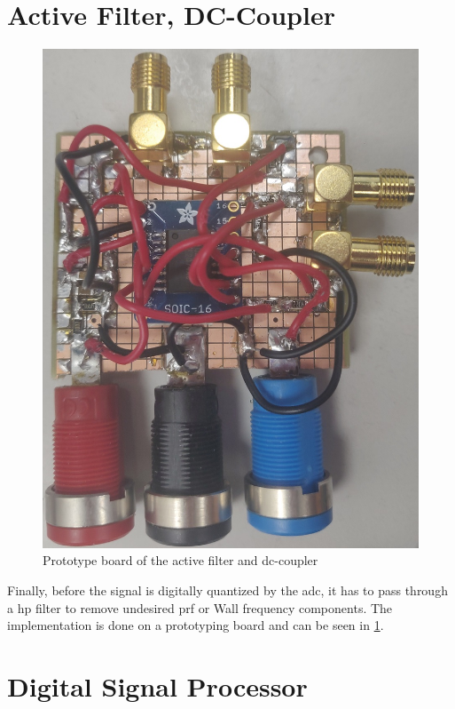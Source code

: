 \section{Active Filter, DC-Coupler}
\begin{figure}[htbp]
	\centering
	\includegraphics[width=.8\textwidth]{Figures/4_dccoupler_filter_pcb_pic.jpg}
	\caption{Prototype board of the active filter and \gls{dc}-coupler}
	\label{fig:4_dccoupler_pcb_pic}
\end{figure}
Finally, before the signal is digitally quantized by the \gls{adc}, it has to pass through a \gls{hp} filter to remove undesired \gls{prf} or Wall frequency components. The implementation is done on a prototyping board and can be seen in \cref{fig:4_dccoupler_pcb_pic}.

\section{Digital Signal Processor}


